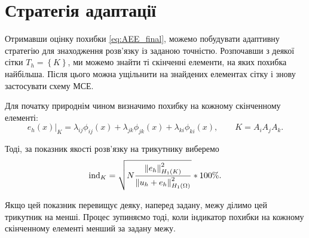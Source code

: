
\section{Стратегія адаптації}

Отримавши оцінку похибки \eqref{eq:AEE_final}, можемо побудувати адаптивну стратегію для знаходження розв'язку із заданою точністю.
Розпочавши з деякої сітки $T_h =  \left\{ K \right\}$, ми можемо знайти ті скінченні елементи, на яких похибка найбільша.
Після цього можна ущільнити на знайдених елементах сітку і знову застосувати схему МСЕ.

Для початку природнім чином визначимо похибку на кожному скінченному елементі:
%
\newcommand{\error}[1]{\lambda_{#1} \phi_{#1}(x)}
\begin{equation}\label{eq:error_element}
	e_h(x)\bigg|_K = \error{ij}+\error{jk}+\error{ki}, \qquad K = A_iA_jA_k.
\end{equation}

Тоді, за показник якості розв'язку на трикутнику виберемо
%
\begin{equation}\label{eq:error_indicator}
	\text{ind}_K = \sqrt{N \frac
			{\left\lVert e_h\right\rVert^2_{H_1(K)}}
			{\left\lVert u_h+e_h\right\rVert^2_{H_1(\Omega)}}
	}*100\%.
\end{equation}

Якщо цей показник перевищує деяку, наперед задану, межу ділимо цей трикутник на менші.
Процес зупиняємо тоді, коли індикатор похибки на кожному скінченному елементі менший за задану межу.

\undef{\error}
